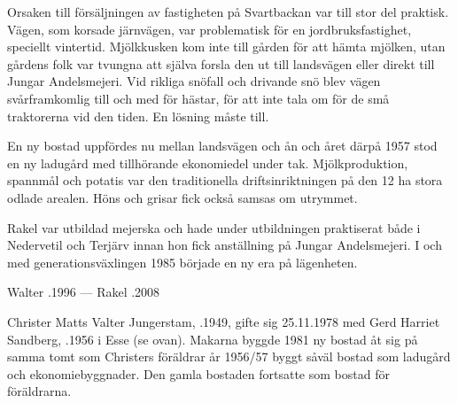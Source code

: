 Orsaken till försäljningen av fastigheten på Svartbackan var till stor del praktisk. Vägen, som korsade järnvägen, var problematisk för en jordbruksfastighet, speciellt vintertid. Mjölkkusken kom inte till gården för att hämta mjölken, utan gårdens folk var tvungna att själva forsla den ut till landsvägen eller direkt till Jungar Andelsmejeri. Vid rikliga snöfall och drivande snö blev vägen svårframkomlig till och med för hästar, för att inte tala om för de små traktorerna vid den tiden. En lösning måste till.

En ny bostad uppfördes nu mellan landsvägen och ån och året därpå 1957 stod en ny ladugård med tillhörande ekonomiedel under tak. Mjölkproduktion, spannmål och potatis var den traditionella driftsinriktningen på den 12 ha stora odlade arealen. Höns och grisar fick också samsas om utrymmet.

Rakel var utbildad mejerska och hade under utbildningen praktiserat både i Nedervetil och Terjärv innan hon fick anställning på Jungar Andelsmejeri. I och med generationsväxlingen 1985 började en ny era på lägenheten.
\begin{jhchildren}
  \item {}
  \item {}
\end{jhchildren}

Walter .1996  ---  Rakel .2008






Christer Matts Valter Jungerstam, .1949, gifte sig 25.11.1978 med Gerd Harriet Sandberg, .1956 i Esse (se ovan). Makarna byggde 1981 ny bostad åt sig på samma tomt som Christers föräldrar år 1956/57 byggt såväl bostad som ladugård och ekonomiebyggnader. Den gamla bostaden fortsatte som bostad för föräldrarna.






